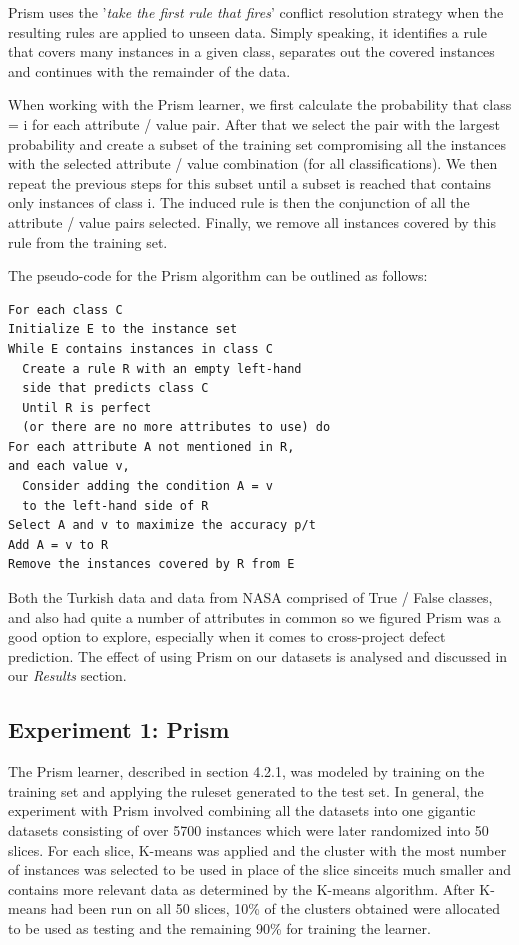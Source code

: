 \documentclass{sig-alternate}
\begin{document}
Prism uses the '{\em take the first rule that fires}' conflict resolution strategy when the resulting rules are applied to unseen data. Simply speaking, it identifies a rule that covers many instances in a given class, separates out the covered instances and continues with the remainder of the data.

When working with the Prism learner, we first calculate the probability that class = i for each attribute / value pair. After that we select the pair with the largest probability and create a subset of the training set compromising all the instances with the selected attribute / value combination (for all classifications). We then repeat the previous steps for this subset until a subset is reached that contains only instances of class i. The induced rule is then the conjunction of all the attribute / value pairs selected. Finally, we remove all instances covered by this rule from the training set.


The pseudo-code for the Prism algorithm can be outlined as follows:
\begin{verbatim}
For each class C
Initialize E to the instance set
While E contains instances in class C
  Create a rule R with an empty left-hand
  side that predicts class C
  Until R is perfect 
  (or there are no more attributes to use) do
For each attribute A not mentioned in R, 
and each value v,
  Consider adding the condition A = v 
  to the left-hand side of R
Select A and v to maximize the accuracy p/t
Add A = v to R
Remove the instances covered by R from E
\end{verbatim}

Both the Turkish data and data from NASA comprised of True / False classes, and also had quite a number of attributes in common so we figured Prism was a good option to explore, especially when it comes to cross-project defect prediction. The effect of using Prism on our datasets is analysed and discussed in our {\em Results} section.


\subsection{Experiment 1: Prism}

The Prism learner, described in section 4.2.1, was modeled by training on the training set and applying the ruleset generated to the test set. In general, the experiment with Prism involved combining all the datasets into one gigantic datasets consisting of over 5700 instances which were later randomized into 50 slices. For each slice, K-means was applied and the cluster with the most number of instances was selected to be used in place of the slice sinceits much smaller and contains more relevant data as determined by the K-means algorithm. After K-means had been run on all 50 slices, 10\% of the clusters obtained were allocated to be used as testing and the remaining 90\% for training the learner.
\end{document}

